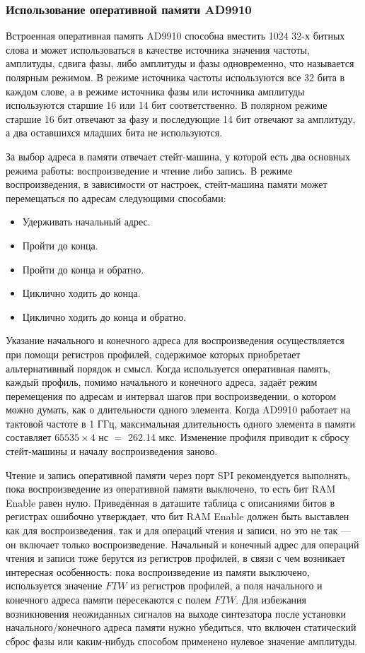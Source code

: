 \documentclass[rusmathsym, eqnumwithinsec, amspack, hyperref]{bomgost}
\begin{document}

\subsubsection{Использование оперативной памяти AD9910}

Встроенная оперативная память AD9910 способна вместить 1024 32-х битных слова и может использоваться в качестве источника значения частоты, амплитуды, сдвига фазы, либо амплитуды и фазы одновременно, что называется полярным режимом. В режиме источника частоты используются все 32 бита в каждом слове, а в режиме источника фазы или источника амплитуды используются старшие 16 или 14 бит соответственно. В полярном режиме старшие 16 бит отвечают за фазу и последующие 14 бит отвечают за амплитуду, а два оставшихся младших бита не используются.

За выбор адреса в памяти отвечает стейт-машина, у которой есть два основных режима работы: воспроизведение и чтение либо запись. В режиме воспроизведения, в зависимости от настроек, стейт-машина памяти может перемещаться по адресам следующими способами:

\begin{itemize}
	\item Удерживать начальный адрес.
	\item Пройти до конца.
	\item Пройти до конца и обратно.
	\item Циклично ходить до конца.
	\item Циклично ходить до конца и обратно.
\end{itemize}

Указание начального и конечного адреса для воспроизведения осуществляется при помощи регистров профилей, содержимое которых приобретает альтернативный порядок и смысл. Когда используется оперативная память, каждый профиль, помимо начального и конечного адреса, задаёт режим перемещения по адресам и интервал шагов при воспроизведении, о котором можно думать, как о длительности одного элемента. Когда AD9910 работает на тактовой частоте в 1 ГГц, максимальная длительность одного элемента в памяти составляет $65535\times4$ нс $=$ 262.14 мкс. Изменение профиля приводит к сбросу стейт-машины и началу воспроизведения заново.

Чтение и запись оперативной памяти через порт SPI рекомендуется выполнять, пока воспроизведение из оперативной памяти выключено, то есть бит RAM Enable равен нулю. Приведённая в даташите таблица с описаниями битов в регистрах ошибочно утверждает, что бит RAM Enable должен быть выставлен как для воспроизведения, так и для операций чтения и записи, но это не так --- он включает только воспроизведение. Начальный и конечный адрес для операций чтения и записи тоже берутся из регистров профилей, в связи с чем возникает интересная особенность: пока воспроизведение из памяти выключено, используется значение $FTW$ из регистров профилей, а поля начального и конечного адреса памяти пересекаются с полем $FTW$. Для избежания возникновения неожиданных сигналов на выходе синтезатора после установки начального/конечного адреса памяти нужно убедиться, что включен статический сброс фазы или каким-нибудь способом применено нулевое значение амплитуды.
\end{document}
